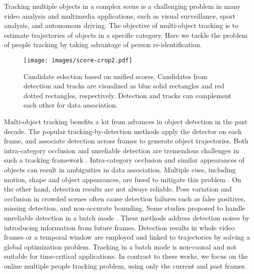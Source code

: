 \documentclass{article}
\begin{document}
Tracking multiple objects in a complex scene is a
challenging problem in many video analysis and multimedia applications, such as
visual surveillance, sport analysis, and autonomous driving.
The objective of multi-object tracking is to estimate trajectories of objects in a specific category.
Here we tackle the problem of people tracking by taking advantage of person re-identification.


\begin{figure}[t]
\begin{center}
\texttt{[image: images/score-crop2.pdf]}
\end{center}
\caption{
Candidate selection based on unified scores.
Candidates from detection and tracks are visualized as blue solid rectangles and red dotted rectangles, respectively.
Detection and tracks can complement each other for data association. }
\label{fig:det-trk}
\end{figure}

Multi-object tracking benefits a lot from advances in object detection in the past decade.
The popular tracking-by-detection methods apply the detector on each frame, and associate 
detection across frames to generate object trajectories.
Both intra-category occlusion and unreliable detection are tremendous challenges in such a tracking framework \cite{bae2017confidence,fagot2016improving}.
Intra-category occlusion and similar appearances of objects can result in ambiguities in data association.
Multiple cues, including motion, shape and object appearances, are fused to
mitigate this problem \cite{sadeghian2017tracking,yan2012track}.
On the other hand, detection results are not always reliable.
Pose variation and occlusion
in crowded scenes often cause
detection failures such as false positives, missing detection, and non-accurate bounding.
Some studies proposed to handle unreliable detection in a batch mode \cite{fagot2016improving,kim2015multiple,tang2017multiple}.
These methods address detection noises by introducing information from future frames.
Detection results in whole video frames or a temporal window are employed and linked to trajectories 
by solving a global optimization problem.
Tracking in a batch mode is non-causal and not suitable for time-critical applications.
In contrast to these works, we focus on the online multiple people tracking problem, using only the current and past frames.
\end{document}
